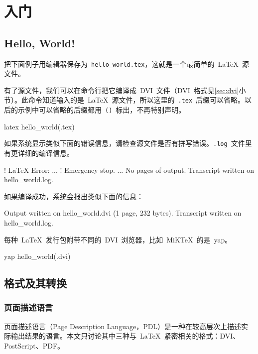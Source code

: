 \chapter{入门}

\section{Hello, World!}
\label{sec:hello_world}
把下面例子用编辑器保存为~\verb|hello_world.tex|，这就是一个最简单的~\LaTeX~源文件。


有了源文件，我们可以在命令行把它编译成~DVI~文件（DVI~格式见\ref{sec:dvi}小节）。此命令知道输入的是~\LaTeX~源文件，所以这里的~\verb|.tex|~后缀可以省略。以后的示例中可以省略的后缀都用~\verb|()|~标出，不再特别声明。
\begin{code}
latex hello_world(.tex)
\end{code}

如果系统显示类似下面的错误信息，请检查源文件是否有拼写错误。\verb|.log|~文件里有更详细的编译信息。
\begin{code}
! LaTeX Error:
...
! Emergency stop.
...
No pages of output.
Transcript written on hello_world.log.
\end{code}

如果编译成功，系统会报出类似下面的信息：
\begin{code}
Output written on hello_world.dvi (1 page, 232 bytes).
Transcript written on hello_world.log.
\end{code}

每种~\LaTeX~发行包附带不同的~DVI~浏览器，比如~MiKTeX~的是~yap。
\begin{code}
yap hello_world(.dvi)
\end{code}

\section{格式及其转换}
\subsection{页面描述语言}
\label{sec:pdl}
页面描述语言（Page Description Language，PDL）是一种在较高层次上描述实际输出结果的语言。本文只讨论其中三种与~\LaTeX~紧密相关的格式：DVI、PostScript、PDF。

